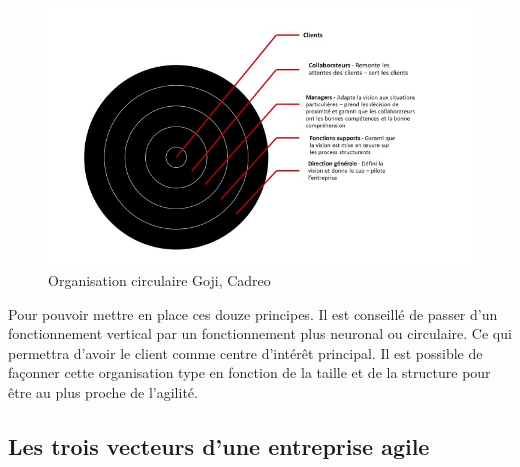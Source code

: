 \documentclass[12pt,a4paper]{article}
\begin{document}
\begin{figure}[h!]
\centering
\includegraphics[scale=0.6]{Organisation-circulaire-goji}
\caption{Organisation circulaire Goji, Cadreo}
\label{fig:Goji}
\end{figure}

Pour pouvoir mettre en place ces douze principes. Il est conseillé de passer d'un fonctionnement vertical par un fonctionnement plus neuronal ou circulaire. Ce qui permettra d'avoir le client comme centre d'intérêt principal.  Il est possible de façonner cette organisation type en fonction de la taille et de la structure pour être au plus proche de l'agilité.

\subsection{Les trois vecteurs d'une entreprise agile}
\end{document}
